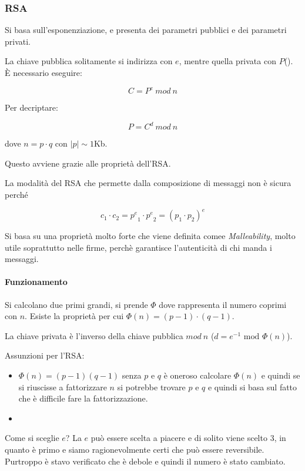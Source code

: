 \subsubsection{RSA}

Si basa sull'esponenziazione, e presenta dei parametri pubblici e dei parametri
privati.


La chiave pubblica solitamente si indirizza con $e$, mentre quella privata con
$P$(). È necessario eseguire:

\[ C = P^e\ mod\ n \]

Per decriptare:

\[ P = C^d\ mod\ n \]

dove $n = p \cdot q$ con $|p| \sim 1$Kb.

Questo avviene grazie alle proprietà dell'RSA.

La modalità del RSA che permette dalla composizione di messaggi non è sicura
perché

\[ c_1 \cdot c_2 = {p^e}_1 \cdot {p^e}_2 = (p_1 \cdot p_2)^e\]


Si basa su una proprietà molto forte che viene definita comee
\textit{Malleability}, molto utile soprattutto nelle firme, perchè garantisce
l'autenticità di chi manda i messaggi.


\paragraph{Funzionamento}

Si calcolano due primi grandi, si prende $\Phi$ dove rappresenta il numero
coprimi con $n$.
Esiste la proprietà per cui $\Phi(n) = (p-1) \cdot (q-1)$.

La chiave privata è l'inverso della chiave pubblica $mod\ n$ ($d = e^{-1}
\text{ mod } \Phi(n)$).

Assunzioni per l'RSA:
\begin{itemize}
	\item {} $\Phi(n) = (p-1)(q-1)$ senza $p$ e $q$ è
oneroso calcolare $\Phi(n)$ e quindi se si riuscisse a fattorizzare $n$ si
potrebbe trovare $p$ e $q$ e quindi si basa sul fatto che è difficile fare la
fattorizzazione.
    \item {}
\end{itemize}


Come si sceglie $e$? La $e$ può essere scelta a piacere e di solito viene scelto
$3$, in quanto è primo e siamo ragionevolmente certi che può essere reversibile.
Purtroppo è stavo verificato che è debole e quindi il numero è stato cambiato.

